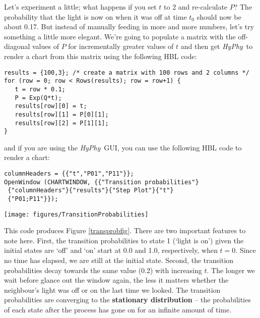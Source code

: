 \documentclass[12pt,twoside,openright]{book}
\newcommand{\hyphy}{\textit{HyPhy}}
\begin{document}
Let's experiment a little; what happens if you set $t$ to 2 and re-calculate $P$?  The probability that the light is now on when it was off at time $t_0$ should now be about 0.17.   But instead of manually feeding in more and more numbers, let's try something a little more elegant.  We're going to populate a matrix with the off-diagonal values of $P$ for incrementally greater values of $t$ and then get \hyphy\ to render a chart from this matrix using the following HBL code:


\begin{leftbar}
\begin{small}
\begin{verbatim}
results = {100,3}; /* create a matrix with 100 rows and 2 columns */
for (row = 0; row < Rows(results); row = row+1) {
   t = row * 0.1;
   P = Exp(Q*t);
   results[row][0] = t;
   results[row][1] = P[0][1];
   results[row][2] = P[1][1];
}
\end{verbatim}
\end{small}
\end{leftbar}

\noindent and if you are using the \hyphy\ GUI, you can use the following HBL code to render a chart:

\begin{leftbar}
\begin{small}
\begin{verbatim}
columnHeaders = {{"t","P01","P11"}};
OpenWindow (CHARTWINDOW, {{"Transition probabilities"}
 {"columnHeaders"}{"results"}{"Step Plot"}{"t"}
 {"P01;P11"}});
\end{verbatim}
\end{small}
\end{leftbar}


\begin{SCfigure}[2][tb]
\texttt{[image: figures/TransitionProbabilities]}
\caption{A \hyphy\ chart window displaying the change in transition probabilities into state 1 (light is `on') conditioned on being in either state 0 (light is `off', plotted in red) or state 1 (plotted in blue) at a time point $t$ units ago.  The window has been resized slightly and may appear different on your computer.}
\label{transprobfig}
\end{SCfigure}


\noindent This code produces Figure \ref{transprobfig}.  There are two important features to note here.  First, the transition probabilities to state 1 (`light is on') given the initial states are `off' and `on' start at 0.0 and 1.0, respectively, when $t=0$.  Since no time has elapsed, we are still at the initial state.  Second, the transition probabilities decay towards the same value (0.2) with increasing $t$.  The longer we wait before glance out the window again, the less it matters whether the neighbour's light was off or on the last time we looked.  The transition probabilities are converging to the \textbf{stationary distribution} -- the probabilities of each state after the process has gone on for an infinite amount of time.  
\end{document}
